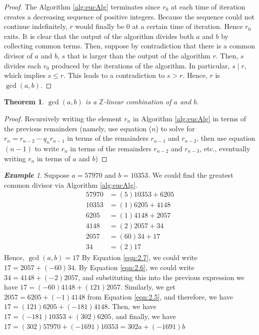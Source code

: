\documentclass[paper=a4, fontsize=11pt]{scrartcl}
\newtheorem{theorem}{Theorem}[section]
\numberwithin{equation}{section}		%
\numberwithin{figure}{section}			%
\numberwithin{table}{section}				%
\theoremstyle{definition}
\theoremstyle{remark}
\theoremstyle{example}
\newtheorem{example}{\textbf{Example}}[section]
\begin{document}
\begin{proof}
    The Algorithm \ref{alg:eucAlg} terminates since $r_0$ at each time of iteration creates a decreasing sequence of positive integers. Because the sequence could not continue indefinitely, $r$ would finally be $0$ at a certain time of iteration. Hence $r_0$ exits. It is clear that the output of the algorithm divides both $a$ and $b$ by collecting common terms. Then, suppose by contradiction that there is a common divisor of $a$ and $b$, $s$ that is larger than the output of the algorithm $r$. Then, $s$ divides each $r_0$ produced by the iterations of the algorithm. In particular, $s \mid r$, which implies $s \leq r$. This leads to a contradiction to $s > r$. Hence, $r$ is $\gcd(a,b)$.
\end{proof}

\begin{theorem}
    $\gcd(a,b)$ is a $\mathbb{Z}$-linear combination of $a$ and $b$.
\end{theorem}

\begin{proof}
    Recursively writing the element $r_n$ in Algorithm \ref{alg:eucAlg} in terms of the previous remainders (namely, use equation ($n$) to solve for $r_n = r_{n-2} - q_nr_{n-1}$ in terms of the remainders $r_{n-1}$ and $r_{n-2}$, then use equation $(n-1)$ to write $r_n$ in terms of the remainders $r_{n-2}$ and $r_{n-3}$, etc., eventually writing $r_n$ in terms of $a$ and $b$) 
\end{proof}

\begin{example}
    Suppose $a = 57970$ and $b = 10353$. We could find the greatest common divisor via Algorithm \ref{alg:eucAlg}.
        \begin{align}
            57970 &= (5)10353 + 6205 \label{eqn:2.3}\\
            10353 &= (1)6205 + 4148 \label{eqn:2.4}\\
            6205 &= (1)4148 + 2057 \label{eqn:2.5}\\
            4148 &= (2)2057 + 34 \label{eqn:2.6}\\
            2057 &= (60)34 + 17 \label{eqn:2.7}\\
            34 &= (2)17
        \end{align}
    Hence, $\gcd(a,b) = 17$
    By Equation \ref{eqn:2.7}, we could write $17 = 2057 + (-60)34$. By Equation \ref{eqn:2.6}, we could write $34 = 4148 + (-2)2057$, and substituting this into the previous expression we have $17 = (-60)4148 + (121)2057$. Similarly, we get $2057 = 6205 + (-1)4148$ from Equation \ref{eqn:2.5}, and therefore, we have $17 = (121)6205 + (-181)4148$. Then, we have $17 = (-181)10353 + (302)6205$, and finally, we have $17 = (302)57970 + (-1691)10353 = 302a + (-1691)b$
\end{example}
\end{document}
